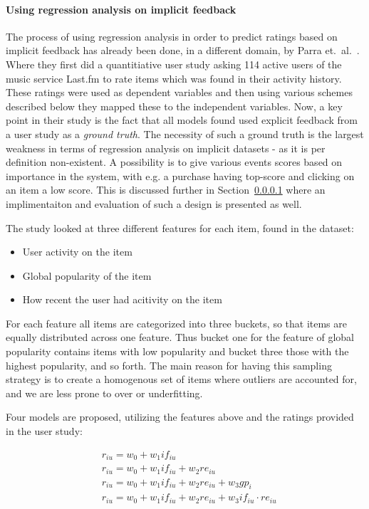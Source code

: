 \paragraph{Using regression analysis on implicit feedback}

The process of using regression analysis in order to predict ratings based on
implicit feedback has already been done, in a different domain, by Parra et.\
al.~\cite{parra2011walk}. Where they first did a quantitiative user study
asking 114 active users of the music service Last.fm to rate items which was
found in their activity history. These ratings were used as dependent variables
and then using various schemes described below they mapped these to the
independent variables. Now, a key point in their study is the fact that all
models found used explicit feedback from a user study as a \textit{ground
truth}. The necessity of such a ground truth is the largest weakness in terms
of regression analysis on implicit datasets - as it is per definition
non-existent. A possibility is to give various events scores based on
importance in the system, with e.g. a purchase having top-score and clicking on
an item a low score. This is discussed further in Section~\ref{} where an
implimentaiton and evaluation of such a design is presented as well.

The study looked at three different features for each item, found in the
dataset:

\begin{itemize}
  \item User activity on the item
  \item Global popularity of the item
  \item How recent the user had acitivity on the item
\end{itemize}

For each feature all items are categorized into three buckets, so that items
are equally distributed across one feature. Thus bucket one for the feature of
global popularity contains items with low popularity and bucket three those
with the highest popularity, and so forth. The main reason for having this
sampling strategy is to create a homogenous set of items where outliers are
accounted for, and we are less prone to over or underfitting.

Four models are proposed, utilizing the features above and the ratings provided
in the user study:

\begin{equation}
  \begin{aligned}
    & r_{iu} = w_0 + w_1 if_{iu} \\
    & r_{iu} = w_0 + w_1 if_{iu} + w_2 re_{iu} \\
    & r_{iu} = w_0 + w_1 if_{iu} + w_2 re_{iu} + w_3 gp_{i} \\
    & r_{iu} = w_0 + w_1 if_{iu} + w_2 re_{iu} + w_3 if_{iu} \cdot re_{iu}
  \end{aligned}
\end{equation}


